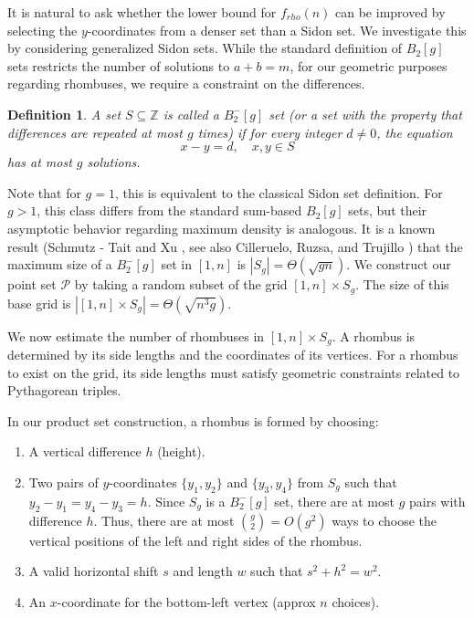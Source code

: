 \documentclass[11pt]{article}
\theoremstyle{plain}
\newtheorem{defi}[theorem]{\bf Definition}
\begin{document}
	It is natural to ask whether the lower bound for $f_{rho}(n)$ can be improved by selecting the $y$-coordinates from a denser set than a Sidon set. We investigate this by considering generalized Sidon sets.
	While the standard definition of $B_2[g]$ sets restricts the number of solutions to $a+b=m$, for our geometric purposes regarding rhombuses, we require a constraint on the differences.
	
	\begin{defi}
		A set $S \subseteq \mathbb{Z}$ is called a $B_2^-[g]$ set (or a set with the property that differences are repeated at most $g$ times) if for every integer $d \neq 0$, the equation 
		\[ x - y = d, \quad x, y \in S \]
		has at most $g$ solutions.
	\end{defi}
	
	Note that for $g=1$, this is equivalent to the classical Sidon set definition. For $g > 1$, this class differs from the standard sum-based $B_2[g]$ sets, but their asymptotic behavior regarding maximum density is analogous. 
	It is a known result (Schmutz - Tait \cite{Tait} and Xu \cite{Xu}, see also Cilleruelo, Ruzsa, and Trujillo \cite{Cilleruelo02}) that the maximum size of a $B_2^-[g]$ set in $[1, n]$ is $|S_g| = \Theta(\sqrt{gn})$.
	We construct our point set $\mathcal{P}$ by taking a random subset of the grid $ [1, n] \times S_g$. The size of this base grid is $|[1, n] \times S_g| = \Theta(\sqrt{n^{3}g})$.
	
	We now estimate the number of rhombuses in $[1, n] \times S_g$. A rhombus is determined by its side lengths and the coordinates of its vertices. For a rhombus to exist on the grid, its side lengths must satisfy geometric constraints related to Pythagorean triples.
	
	In our product set construction, a rhombus is formed by choosing:
	\begin{enumerate}
		\item A vertical difference $h$ (height).
		\item Two pairs of $y$-coordinates $\{y_1, y_2\}$ and $\{y_3, y_4\}$ from $S_g$ such that $y_2 - y_1 = y_4 - y_3 = h$. Since $S_g$ is a $B_2^-[g]$ set, there are at most $g$ pairs with difference $h$. Thus, there are at most $\binom{g}{2} = O(g^2)$ ways to choose the vertical positions of the left and right sides of the rhombus.
		\item A valid horizontal shift $s$ and length $w$ such that $s^2 + h^2 = w^2$.
		\item An $x$-coordinate for the bottom-left vertex (approx $n$ choices).
	\end{enumerate}
	
\end{document}
